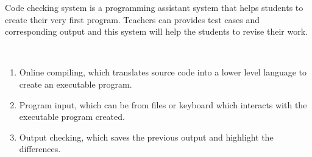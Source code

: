 Code checking system is a programming assistant system that helps students to create their very first program. Teachers can provides test cases and corresponding output and this system will help the students to revise their work.\par~

\begin{enumerate}
  \item Online compiling, which translates source code into a lower level language to create an executable program.
  \item Program input, which can be from files or keyboard which interacts with the executable program created.
  \item Output checking, which saves the previous output and highlight the differences.
\end{enumerate}
